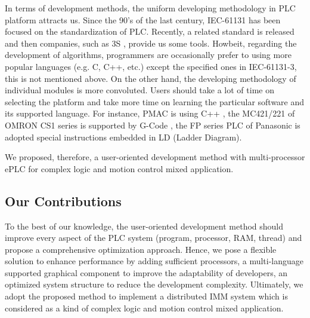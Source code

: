 \documentclass[journal,UTF8]{IEEEtran}
\begin{document}
In terms of development methods, the uniform developing methodology in PLC platform attracts us. Since the 90's of the last century, IEC-61131 has been focused on the standardization of PLC. Recently, a related standard \cite{S2006Advanced} is released and then companies, such as 3S \cite{3S2017Logic}, provide us some tools. Howbeit, regarding the development of algorithms, programmers are occasionally prefer to using more popular languages (e.g. C, C++, etc.) except the specified ones in IEC-61131-3, this is not mentioned above. On the other hand, the developing methodology of individual modules is more convoluted. Users should take a lot of time on selecting the platform and take more time on learning the particular software and its supported language. For instance, PMAC is using C++ \cite{Peng2011Linear,Qian2014A}, the MC421/221 of OMRON CS1 series is supported by G-Code \cite{OMRON2006CS1W}, the FP series PLC of Panasonic is adopted special instructions embedded in LD (Ladder Diagram). 

We proposed, therefore, a user-oriented development method with multi-processor ePLC for complex logic and motion control mixed application.

\subsection{Our Contributions}
To the best of our knowledge, the user-oriented development method should improve every aspect of the PLC system (program, processor, RAM, thread) and propose a comprehensive optimization approach. Hence, we pose a flexible solution to enhance performance by adding sufficient processors, a multi-language supported graphical component to improve the adaptability of developers, an optimized system structure to reduce the development complexity. Ultimately, we adopt the proposed method to implement a distributed IMM system which is considered as a kind of complex logic and motion control mixed application. 
\end{document}
